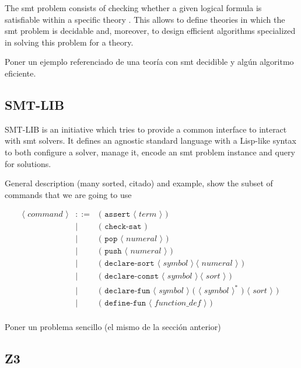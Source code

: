 The \gls{smt} problem consists of checking whether
a given logical formula is satisfiable within a specific theory
\citep{smtLibStandard}. This allows to define theories in which the \gls{smt} problem
is decidable and, moreover, to design efficient algorithms specialized in 
solving this problem for a theory.

Poner un ejemplo referenciado de una teoría con \gls{smt} decidible y algún 
algoritmo eficiente.

\subsection{SMT-LIB}

SMT-LIB is an initiative which tries to provide a common interface to interact
with \acrshort{smt} solvers. It defines an agnostic standard language with a Lisp-like
syntax to both configure a solver, manage it, encode an \gls{smt} problem 
instance and query for solutions.

General description (many sorted, citado) and example, show the subset of commands that we are going to use

\[
\begin{array}{rcll}
\langle\textit{ command }\rangle & ::= & \texttt{( assert } \langle\textit{ term }\rangle\texttt{ ) }\\
& | & \texttt{( check-sat )}\\
& | & \texttt{( pop } \langle\textit{ numeral }\rangle \texttt{ ) }\\
& | & \texttt{( push } \langle\textit{ numeral }\rangle \texttt{ ) }\\
& | & \texttt{( declare-sort } \langle\textit{ symbol }\rangle~\langle\textit{ numeral }\rangle\texttt{ ) }\\
& | & \texttt{( declare-const } \langle\textit{ symbol }\rangle~\langle\textit{ sort }\rangle\texttt{ ) }\\
& | & \texttt{( declare-fun } \langle\textit{ symbol }\rangle \texttt{ ( }\langle\textit{ symbol }\rangle^* \texttt{ ) }\langle\textit{ sort }\rangle\texttt{ ) }\\
& | & \texttt{( define-fun } \langle\textit{ function\_def }\rangle\texttt{ ) }\\
\end{array}
\]

Poner un problema sencillo (el mismo de la sección anterior)

\subsection{Z3}

